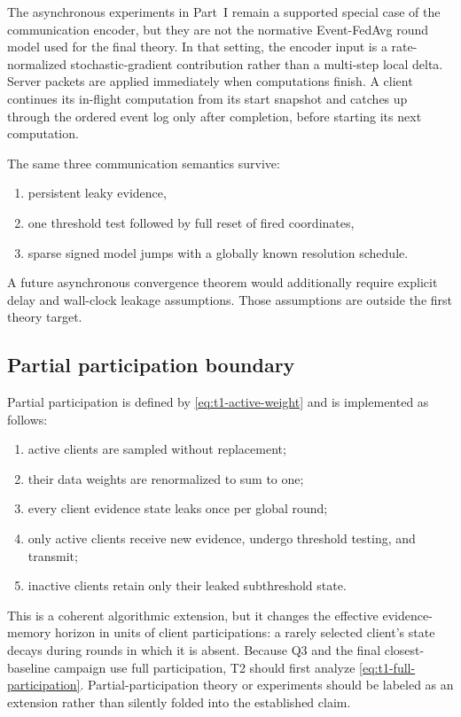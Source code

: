 The asynchronous experiments in Part~I remain a supported special case of the communication encoder, but they are not the normative Event-FedAvg round model used for the final theory. In that setting, the encoder input is a rate-normalized stochastic-gradient contribution rather than a multi-step local delta. Server packets are applied immediately when computations finish. A client continues its in-flight computation from its start snapshot and catches up through the ordered event log only after completion, before starting its next computation.

The same three communication semantics survive:
\begin{enumerate}
    \item persistent leaky evidence,
    \item one threshold test followed by full reset of fired coordinates,
    \item sparse signed model jumps with a globally known resolution schedule.
\end{enumerate}
A future asynchronous convergence theorem would additionally require explicit delay and wall-clock leakage assumptions. Those assumptions are outside the first theory target.

\subsection{Partial participation boundary}

Partial participation is defined by \eqref{eq:t1-active-weight} and is implemented as follows:
\begin{enumerate}
    \item active clients are sampled without replacement;
    \item their data weights are renormalized to sum to one;
    \item every client evidence state leaks once per global round;
    \item only active clients receive new evidence, undergo threshold testing, and transmit;
    \item inactive clients retain only their leaked subthreshold state.
\end{enumerate}
This is a coherent algorithmic extension, but it changes the effective evidence-memory horizon in units of client participations: a rarely selected client's state decays during rounds in which it is absent. Because Q3 and the final closest-baseline campaign use full participation, T2 should first analyze \eqref{eq:t1-full-participation}. Partial-participation theory or experiments should be labeled as an extension rather than silently folded into the established claim.

